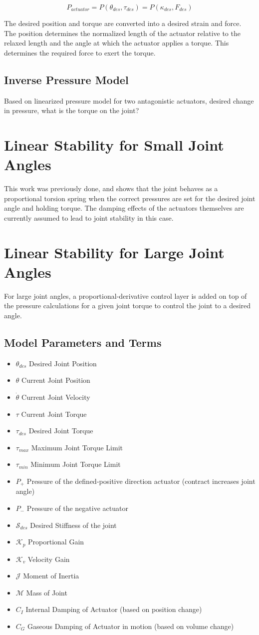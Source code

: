 \documentclass[12pt, letterpaper, oneside, notitlepage, onecolumn]{article}
\newcommand{\bbs}[1]{\section{#1}}
\newcommand{\bbss}[1]{\subsection{#1}}
\begin{document}
\begin{equation}
P_{actuator} = P(\theta_{des}, \tau_{des}) = P(\kappa_{des}, F_{des})
\end{equation}

The desired position and torque are converted into a desired strain and force.
The position determines the normalized length of the actuator relative to the 
relaxed length and the angle at which the actuator applies a torque. This
determines the required force to exert the torque.

\bbss{Inverse Pressure Model}

Based on linearized pressure model for two antagonistic actuators, desired 
change in pressure, what is the torque on the joint?

\bbs{Linear Stability for Small Joint Angles}

This work was previously done, and shows that the joint behaves as a
proportional torsion spring when the correct pressures are set for the desired
joint angle and holding torque. The damping effects of the actuators themselves
are currently assumed to lead to joint stability in this case.

\bbs{Linear Stability for Large Joint Angles}

For large joint angles, a proportional-derivative control layer is added on top
of the pressure calculations for a given joint torque to control the joint to a
desired angle.

\bbss{Model Parameters and Terms}

\begin{itemize}
\item $\theta_{des}$ Desired Joint Position
\item $\theta$ Current Joint Position
\item $\dot{\theta}$ Current Joint Velocity
\item $\tau$ Current Joint Torque
\item $\tau_{des}$ Desired Joint Torque
\item $\tau_{max}$ Maximum Joint Torque Limit
\item $\tau_{min}$ Minimum Joint Torque Limit
\item $P_{+}$ Pressure of the defined-positive direction actuator (contract
increases joint angle)
\item $P_{-}$ Pressure of the negative actuator

\item $\mathcal{S}_{des}$ Desired Stiffness of the joint
\item $\mathcal{K}_{p}$ Proportional Gain
\item $\mathcal{K}_{v}$ Velocity Gain

\item $\mathcal{J}$ Moment of Inertia
\item $\mathcal{M}$ Mass of Joint
\item $C_{I}$ Internal Damping of Actuator (based on position change)
\item $C_{G}$ Gaseous Damping of Actuator in motion (based on volume change)
\end{itemize}
\end{document}
